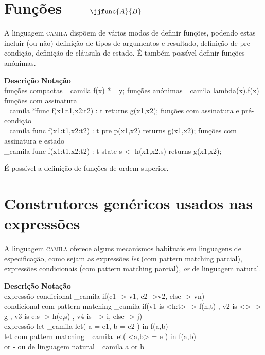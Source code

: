 \documentclass[portuges,a4paper]{article}
\def\camila{\textsc{camila}}
\begin{document}
\section{Funções --- $\jjfunc{A}{B}$}

A linguagem \camila{} dispõem de vários modos de definir funções, podendo estas
incluir (ou não) definição de tipos de argumentos e resultado, definição
de pre-condição, definição de cláusula de estado.
É também possível definir funções anónimas.
\begin{framed}
\noindent \textbf{Descrição}  \hfill  \textbf{Notação} \ \  \\
 funções compactas \dotfill  \_camila{ f(x) *= y;} 
 funções anónimas \dotfill \_camila{ lambda(x).f(x) } \\
 funções com assinatura  \\ \_camila{ *func f(x1:t1,x2:t2) : t
                                     returns g(x1,x2);} 
 funções com assinatura e pré-condição \\ \_camila{ func f(x1:t1,x2:t2) : t
                                     pre p(x1,x2)
                                     returns g(x1,x2);} 
 funções com assinatura e estado  \\ \_camila{ func f(x1:t1,x2:t2) : t
                                     state s <- h(x1,x2,s)
                                     returns g(x1,x2);} 
\end{framed}

É possível a definição de funções de ordem superior.

\section{Construtores genéricos usados nas expressões}

A linguagem \camila{} oferece alguns mecanismos habituais em linguagens de
especificação, como sejam as expressões \emph{let} (com pattern matching
parcial), expressões condicionais (com pattern matching parcial), 
\emph{or} de linguagem natural.

\begin{framed}
\noindent \textbf{Descrição}  \hfill  \textbf{Notação} \ \  \\
 expressão condicional \dotfill \_camila{ if(c1 -> v1, c2 ->v2, else -> vn)} \\
 condicional com pattern matching \dotfill 
         \_camila{ if(v1 is-<h:t> -> f(h,t) ,
                         v2 is-<>    -> g  ,
                         v3 is-{e:s} -> h(e,s) ,
                         v4 is-{}    -> i,
                         else        -> j) } \\
 expressão let \dotfill \_camila{ let( a = e1, b = e2 ) in f(a,b) } \\
 let com pattern matching \dotfill \_camila{ let( <a,b> = e ) in f(a,b) } \\
 or - ou de linguagem natural \dotfill \_camila{ a or b }
\end{framed}
\end{document}
